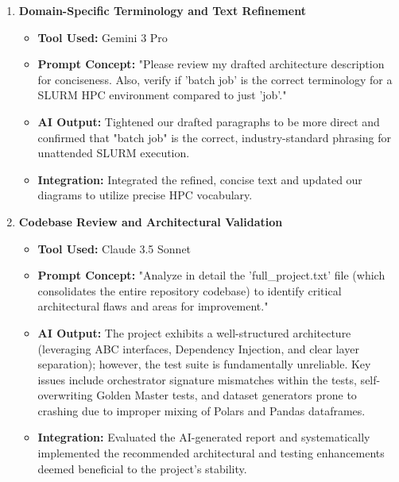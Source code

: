 \documentclass[11pt, a4paper]{article}
\begin{document}
\begin{enumerate}[label=\textbf{Topic \arabic*:}, align=left, leftmargin=0.5cm]
    \item \textbf{Domain-Specific Terminology and Text Refinement}
    \begin{itemize}[label={}, leftmargin=0.5cm]
        \item \textbf{Tool Used:} Gemini 3 Pro
        \item \textbf{Prompt Concept:} "Please review my drafted architecture description for conciseness. Also, verify if 'batch job' is the correct terminology for a SLURM HPC environment compared to just 'job'."
        \item \textbf{AI Output:} Tightened our drafted paragraphs to be more direct and confirmed that "batch job" is the correct, industry-standard phrasing for unattended SLURM execution.
        \item \textbf{Integration:} Integrated the refined, concise text and updated our diagrams to utilize precise HPC vocabulary.
    \end{itemize}
    \vspace{0.3cm}

    \item \textbf{Codebase Review and Architectural Validation}
    \begin{itemize}[label={}, leftmargin=0.5cm]
        \item \textbf{Tool Used:} Claude 3.5 Sonnet
        \item \textbf{Prompt Concept:} "Analyze in detail the 'full\_project.txt' file (which consolidates the entire repository codebase) to identify critical architectural flaws and areas for improvement."
        \item \textbf{AI Output:} The project exhibits a well-structured architecture (leveraging ABC interfaces, Dependency Injection, and clear layer separation); however, the test suite is fundamentally unreliable. Key issues include orchestrator signature mismatches within the tests, self-overwriting Golden Master tests, and dataset generators prone to crashing due to improper mixing of Polars and Pandas dataframes.
        \item \textbf{Integration:} Evaluated the AI-generated report and systematically implemented the recommended architectural and testing enhancements deemed beneficial to the project's stability.
    \end{itemize}
    \vspace{0.3cm}


\end{enumerate}
\end{document}
